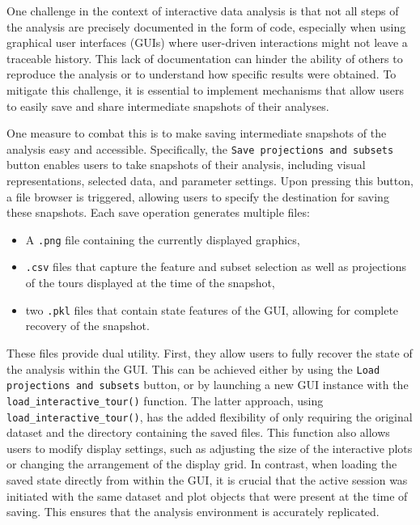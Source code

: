 \documentclass[article]{ajs}
\begin{document}
One challenge in the context of interactive data analysis is that not all steps of the analysis are precisely documented in the form of code, especially when using graphical user interfaces (GUIs) where user-driven interactions might not leave a traceable history. This lack of documentation can hinder the ability of others to reproduce the analysis or to understand how specific results were obtained. To mitigate this challenge, it is essential to implement mechanisms that allow users to easily save and share intermediate snapshots of their analyses.

One measure to combat this is to make saving intermediate snapshots of the analysis easy and accessible. Specifically, the \texttt{Save projections and subsets} button enables users to take snapshots of their analysis, including visual representations, selected data, and parameter settings. Upon pressing this button, a file browser is triggered, allowing users to specify the destination for saving these snapshots. Each save operation generates multiple files:


\begin{itemize}
    \item A \texttt{.png} file containing the currently displayed graphics,
    \item \texttt{.csv} files that capture the feature and subset selection as well as projections of the tours displayed at the time of the snapshot,
    \item two \texttt{.pkl} files that contain state features of the GUI, allowing for complete recovery of the snapshot.
\end{itemize}

These files provide dual utility. First, they allow users to fully recover the state of the analysis within the GUI. This can be achieved either by using the \texttt{Load projections and subsets} button, or by launching a new GUI instance with the \texttt{load\_interactive\_tour()} function. The latter approach, using \texttt{load\_interactive\_tour()}, has the added flexibility of only requiring the original dataset and the directory containing the saved files. This function also allows users to modify display settings, such as adjusting the size of the interactive plots or changing the arrangement of the display grid. In contrast, when loading the saved state directly from within the GUI, it is crucial that the active session was initiated with the same dataset and plot objects that were present at the time of saving. This ensures that the analysis environment is accurately replicated.
\end{document}
